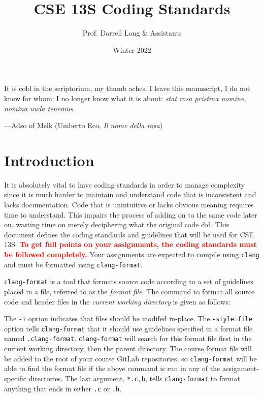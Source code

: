 \documentclass[11pt]{article}
\title{CSE 13S Coding Standards}
\author{Prof. Darrell Long \& Assistants}
\date{Winter 2022}
\begin{document}
\maketitle

\textwidth
\epigraph{It is cold in the scriptorium, my thumb aches. I leave
this manuscript, I do not know for whom; I no longer know what it
is about: \emph{stat rosa pristina nomine, nomina nuda tenemus.}}{---Adso of
Melk (Umberto Eco, \emph{Il nome della rosa})}

\section{Introduction}

It is absolutely vital to have coding standards in order to manage
complexity since it is much harder to maintain and understand code that
is inconsistent and lacks documentation. Code that is unintuitive or
lacks obvious meaning requires time to understand. This impairs the
process of adding on to the same code later on, wasting time on merely
deciphering what the original code did. This document defines the coding
standards and guidelines that will be used for CSE\,13S.
\textcolor{red}{\textbf{To get full points on your assignments, the
coding standards must be followed completely.}} Your assignments are
expected to compile using \texttt{clang} and must be formatted using
\texttt{clang-format}.

\texttt{clang-format} is a tool that formats source code according to a
set of guidelines placed in a file, referred to as the \emph{format
file}. The command to format all source code and header files in the
\emph{current working directory} is given as follows:


The \texttt{-i} option indicates that files should be modifed in-place.
The \texttt{-style=file} option tells \texttt{clang-format} that it
should use guidelines specified in a format file named
\texttt{.clang-format}. \texttt{clang-format} will search for this
format file first in the current working directory, then the parent
directory. The course format file will be added to the root of your
course GitLab repositories, so \texttt{clang-format} will be able to
find the format file if the above command is run in any of the
assignment-specific directories. The last argument, \texttt{*.{c,h}},
tells \texttt{clang-format} to format anything that ends in either
\texttt{.c} or \texttt{.h}.
\end{document}
